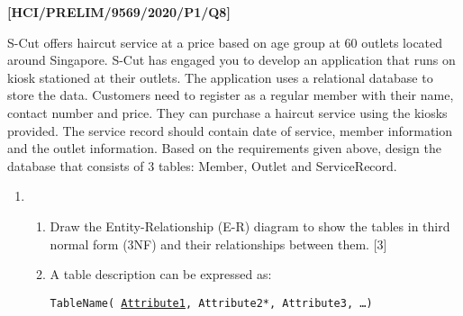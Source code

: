 \item \textbf{{[}HCI/PRELIM/9569/2020/P1/Q8{]} }

S-Cut offers haircut service at a price based on age group at 60 outlets
located around Singapore. S-Cut has engaged you to develop an application
that runs on kiosk stationed at their outlets. The application uses
a relational database to store the data. Customers need to register
as a regular member with their name, contact number and price. They
can purchase a haircut service using the kiosks provided. The service
record should contain date of service, member information and the
outlet information. Based on the requirements given above, design
the database that consists of 3 tables: Member, Outlet and ServiceRecord.
\begin{enumerate}
\item {}
\begin{enumerate}
\item Draw the Entity-Relationship (E-R) diagram to show the tables in third
normal form (3NF) and their relationships between them. \hfill{}{[}3{]}
\item A table description can be expressed as:

\texttt{TableName( }\texttt{\uline{Attribute1}}\texttt{, Attribute2{*},
Attribute3, \dots ) }


\end{enumerate}
\end{enumerate}

